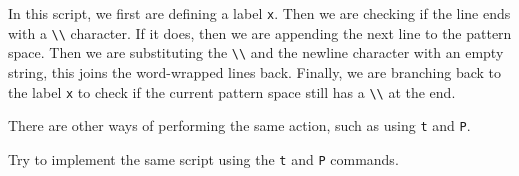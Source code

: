 In this script, we first are defining a label \lstinline|x|.
Then we are checking if the line ends with a \lstinline|\\| character.
If it does, then we are appending the next line to the pattern space.
Then we are substituting the \lstinline|\\| and the newline character with an empty string, this joins the word-wrapped lines back.
Finally, we are branching back to the label \lstinline|x| to check if the current pattern space still has a \lstinline|\\| at the end.

There are other ways of performing the same action, such as using \lstinline|t| and \lstinline|P|.

\begin{exercise}
  Try to implement the same script using the \lstinline|t| and \lstinline|P| commands.
\end{exercise}
